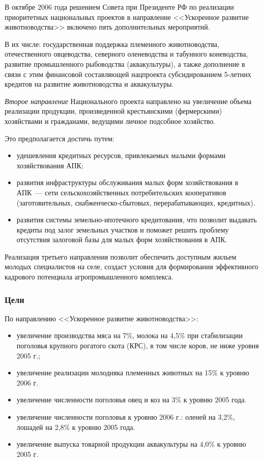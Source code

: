 \documentclass[article, 12pt, russian, oneside]{ncc}
\begin{document}
В октябре 2006 года решением Совета при Президенте РФ по реализации
приоритетных национальных проектов в направление <<Ускоренное развитие
животноводства>> включено пять дополнительных мероприятий.

В их числе: государственная поддержка племенного животноводства,
отечественного овцеводства, северного оленеводства и табунного
коневодства, развитие промышленного рыбоводства (аквакультуры), а
также дополнение в связи с этим финансовой составляющей нацпроекта
субсидированием 5-летних кредитов на развитие животноводства и
аквакультуры.

\emph{Второе направление} Национального проекта направлено на
увеличение объема реализации продукции, произведенной крестьянскими
(фермерскими) хозяйствами и гражданами, ведущими личное подсобное
хозяйство.

Это предполагается достичь путем:

\begin{itemize}
\item удешевления кредитных ресурсов, привлекаемых малыми формами
  хозяйствования АПК;
\item развития инфраструктуры обслуживания малых форм хозяйствования в
  АПК~--- сети сельскохозяйственных потребительских кооперативов
  (заготовительных, снабженческо-сбытовых, перерабатывающих,
  кредитных).
\item развития системы земельно-ипотечного кредитования, что позволит
  выдавать кредиты под залог земельных участков и поможет решить
  проблему отсутствия залоговой базы для малых форм хозяйствования в
  АПК.
\end{itemize}

Реализация третьего направления позволит обеспечить доступным жильем
молодых специалистов на селе, создаст условия для формирования
эффективного кадрового потенциала агропромышленного комплекса.

\subsubsection{Цели}

По направлению <<Ускоренное развитие животноводства>>:

\begin{itemize}
\item увеличение производства мяса на 7\%, молока на 4,5\% при
  стабилизации поголовья крупного рогатого скота (КРС), в том числе
  коров, не ниже уровня 2005 г.;
\item увеличение реализации молодняка племенных животных на 15\% к
  уровню 2006 г.
\item увеличение численности поголовья овец и коз на 3\% к уровню 2005
  года.
\item увеличение численности поголовья к уровню 2006 г.: оленей на
  3,2\%, лошадей на 2,8\% к уровню 2005 года.
\item увеличение выпуска товарной продукции аквакультуры на 4,0\% к
  уровню 2005 г.
\end{itemize}
\end{document}
